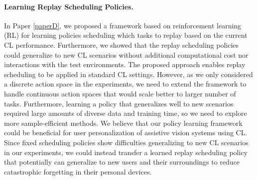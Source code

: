 \paragraph{Learning Replay Scheduling Policies.} In Paper \ref{paperD}, we proposed a framework based on reinforcement learning (RL) for learning policies scheduling which tasks to replay based on the current CL performance. Furthermore, we showed that the replay scheduling policies could generalize to new CL scenarios without additional computational cost nor interactions with the test environments. The proposed approach enables replay scheduling to be applied in standard CL settings. However, as we only considered a discrete action space in the experiments, we need to extend the framework to handle continuous action spaces that would scale better to larger number of tasks. Furthermore, learning a policy that generalizes well to new scenarios required large amounts of diverse data and training time, so we need to explore more sample-efficient methods. We believe that our policy learning framework could be beneficial for user personalization of assistive vision systems using CL. Since fixed scheduling policies show difficulties generalizing to new CL scenarios in our experiments, we could instead transfer a learned replay scheduling policy that potentially can generalize to new users and their surroundings to reduce catastrophic forgetting in their personal devices. 






